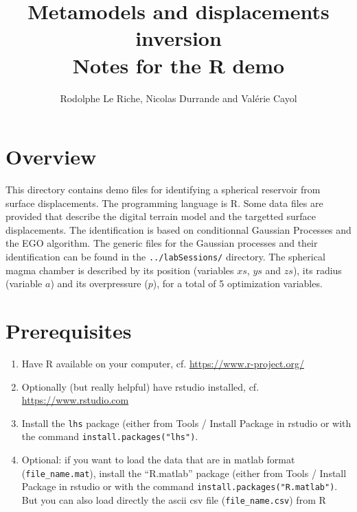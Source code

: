 \documentclass[12pt]{article}
\begin{document}
\title{Metamodels and displacements  inversion \\ Notes for the R demo}
\author{Rodolphe Le Riche, Nicolas Durrande and Valérie Cayol}
\maketitle

\section{Overview}
This directory contains demo files for identifying a spherical reservoir from surface displacements. The programming language is R. 
Some data files are provided that describe the digital terrain model and the targetted surface displacements.
The identification is based on conditionnal Gaussian Processes and the EGO algorithm. 
The generic files for the Gaussian processes and their identification can be found in the \texttt{../labSessions/} directory.
The spherical magma chamber is described by its position (variables $xs$, $ys$ and $zs$), its radius (variable $a$) and 
its overpressure ($p$), for a total of 5 optimization variables.

\section{Prerequisites}
\begin{enumerate}
\item Have R available on your computer, cf. \url{https://www.r-project.org/}
\item Optionally (but really helpful) have rstudio installed, cf. \url{https://www.rstudio.com}
\item Install the \texttt{lhs} package (either from Tools / Install Package in rstudio or with the command \texttt{install.packages("lhs")}.
\item Optional: if you want to load the data that are in matlab format (\texttt{file\_name.mat}), 
install the ``R.matlab'' package (either from Tools / Install Package in rstudio or with the command \texttt{install.packages("R.matlab")}. But you can also load directly the ascii csv file (\texttt{file\_name.csv}) from R
\end{enumerate}
\end{document}
